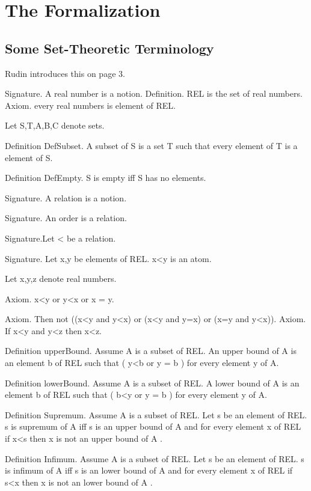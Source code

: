 \documentclass{article}
\newenvironment{forthel}{\begin{leftbar}}{\end{leftbar}}
\begin{document}
\section{The Formalization}
\subsection{Some Set-Theoretic Terminology}

Rudin introduces this on page 3.

\begin{forthel}
[set/-s] [element/-s] [belong/-s] [subset/-s] [relation/-s] [number/-s]

Signature. A real number is a notion.
Definition. REL is the set of real numbers. 
Axiom. every real numbers is element of REL.






Let S,T,A,B,C denote sets.

Definition DefSubset.   A subset of S is a set T
such that every element of T is a element of S.

Definition DefEmpty.    S is empty iff S has no elements.

Signature. A relation is a notion.

Signature. An order is a relation.

Signature.Let < be a relation.

Signature. Let x,y be elements of REL. x<y is an atom.

Let x,y,z denote real numbers.

Axiom. x<y or y<x or x = y.

Axiom. Then not ((x<y and y<x) or (x<y and y=x) or (x=y and y<x)).
Axiom. If x<y and y<z then x<z.



Definition upperBound.
Assume A is a subset of REL.
An upper bound of A is an element b of REL such that ( y<b or y = b ) for every element y of A.

Definition lowerBound.
Assume A is a subset of REL.
A lower bound of A is an element b of REL such that ( b<y or y = b ) for every element y of A.

Definition Supremum.
Assume A is a subset of REL.
Let s be an element of REL.
s is supremum of A  iff s is an upper bound of A 
and for every element x of REL if x<s then x is not an upper bound of A .

Definition Infimum.
Assume A is a subset of REL.
Let s be an element of REL.
s is infimum of A  iff s is an lower bound of A 
and for every element x of REL if s<x then x is not an lower bound of A .


\end{forthel}
\end{document}
